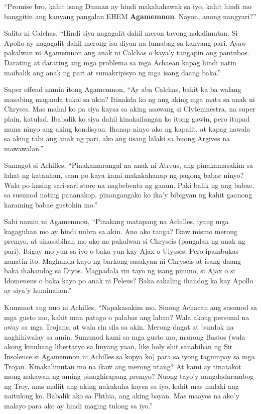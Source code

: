 \documentclass[12pt,letterpaper]{report}
\begin{document}
``Promise bro, kahit isang Danaan ay hindi makahahawak sa iyo, kahit hindi mo banggitin ang kanyang pangalan EHEM \textbf{Agamemnon}. Nayon, anong nangyari?''

Salita ni Calchas, ``Hindi siya nagagalit dahil meron tayong nakalimutan. Si Apollo ay nagagalit dahil merong isa diyan na lumabag sa kanyang pari. Ayaw pakalwan ni Agamemnon ang anak ni Calchas o kaya'y tangapin ang pantubos. Darating at darating ang mga problema sa mga Achaean kapag hindi natin maibalik ang anak ng pari at sumakripisyo ng mga isang daang baka.''

Super offend namin itong Agamemnon, ``Ay aba Calchas, bakit ka ba walang masabing maganda tukol sa akin? Itinakda ko ng ang aking mga mata sa anak ni Chryses. Mas mahal ko pa siya kaysa sa aking asawang si Clytemnestra, na super plain, katulad. Ibabalik ko siya dahil kinakailangan ko itong gawin, pero itupad muna ninyo ang aking kondisyon. Ihanap ninyo ako ng kapalit, at kapag nawala sa aking tabi ang anak ng pari, ako ang iisang lalaki sa buong Argives na mawawalan.''

Sumagot si Achilles, ``Pinakamarangal na anak ni Atreus, ang pinakamasakim sa lahat ng katauhan, saan po kaya kami makakahanap ng pagong babae ninyo? Wala po kasing sari-sari store na nagbebenta ng ganun. Paki balik ng ang babae, sa susunod nating pananakop, pinangangako ko ika'y bibigyan ng kahit gaanong karaming babae gustohin mo.''

Sabi namin ni Agamemnon, ``Pinakang matapang na Achilles, iyang mga kagaguhan mo ay hindi uubra sa akin. Ano ako tanga? Ikaw mismo merong premyo, at sinasabihan mo ako na pakalwan si Chryseis (pangalan ng anak ng pari). Ibigay mo yun sa iyo o baka yun kay  Ajax o Ulysses. Pero ipambukas nanatin ito. Maghanda kayo ng barkong sasakyan ni Chryseis at isang daang baka ihahandog sa Diyos. Magpadala rin tayo ng isang pinuno, si Ajax o si Idomeneus o baka kayo po anak ni Peleus? Baka sakaling ihandog ka kay Apollo ay siya'y huminahon.''

Kumunot ang nuo ni Achilles, ``Napakasakim mo. Sinong Achaean ang susunod sa mga gusto mo, kahit man patago o palabas ang laban? Wala akong personal na away sa mga Trojans, at wala rin sila sa akin. Merong dagat at bundok na naghihiwalay sa amin. Sumunod kami sa mga gusto mo, manong Bastos (wala akong kinuhang libertaryo sa linyang yaan, like holy shit sanabihan ng Sir Insolence si Agamemnon ni Achilles sa kopya ko) para sa iyong tagumpay sa mga Trojan. Kinakalimutan mo na ikaw ang merong utang? At kami ay tinatakot mong nakawan ng aming pinaghirapang premyo? Nuong tayo'y nangdadarambog ng Troy, mas maliit ang aking nakukuha kaysa sa iyo, kahit mas malaki ang naitulong ko. Babalik ako sa Phthia, ang aking bayan. Mas maayos na ako'y malayo para ako ay hindi maging tulong sa iyo.''
\end{document}
